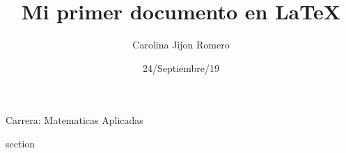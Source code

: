\documentclass{article}%
\title{Mi primer documento en LaTeX}
\author{Carolina Jijon Romero}
\date{24/Septiembre/19}
\begin{document}
	
\maketitle%
\begin{titlepage}
	\maketitle
\end{titlepage}

Carrera: Matematicas Aplicadas 

\begin{abstract}
	
\end{abstract}
section{}
\end{document}
